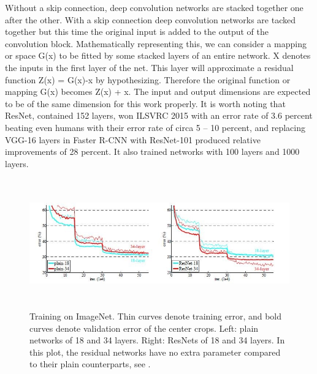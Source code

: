 {Without a skip connection, deep convolution networks are stacked together one after the other.  With a skip connection deep convolution networks are tacked together but this time the original input is added to the output of the convolution block.
Mathematically representing this, we can consider a mapping or space G(x) to be fitted by some stacked layers of an entire network.  X denotes the inputs in the first layer of the net. This layer will approximate a residual function Z(x) = G(x)-x by hypothesizing.  Therefore the original function or mapping G(x) becomes Z(x) + x.  The input and output dimensions are expected to be of the same dimension for this work properly.  It is worth noting that ResNet, contained 152 layers, won ILSVRC 2015 with an error rate of 3.6 percent beating even humans with their error rate of circa 5 – 10 percent, and replacing VGG-16 layers in Faster R-CNN with ResNet-101 produced relative improvements of 28 percent. It also trained networks with 100 layers and 1000 layers. 

\begin{figure}[H]
  \includegraphics[height=2.2in]{images/resnet-graph.jpg}
   \caption{Training on ImageNet. Thin curves denote training error, and bold curves denote validation error of the center crops. Left: plain networks of 18 and 34 layers. Right: ResNets of 18 and 34 layers. In this plot, the residual networks have no extra parameter compared to their plain counterparts, see \cite{M}.}
\end{figure}

}
